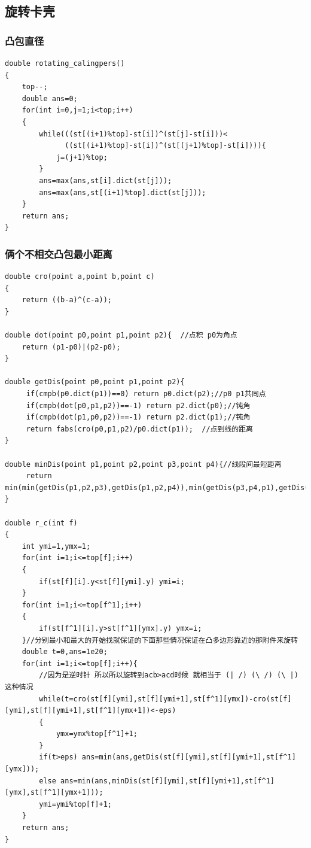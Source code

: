 \documentclass[12pt, a4paper, oneside]{ctexart}
\begin{document}
\newpage 
\subsection{旋转卡壳} 
\subsubsection{凸包直径}
\begin{lstlisting}
double rotating_calingpers()
{
    top--;
 	double ans=0;
    for(int i=0,j=1;i<top;i++)
    {
        while(((st[(i+1)%top]-st[i])^(st[j]-st[i]))<
              ((st[(i+1)%top]-st[i])^(st[(j+1)%top]-st[i]))){
            j=(j+1)%top;
        }
        ans=max(ans,st[i].dict(st[j]));
        ans=max(ans,st[(i+1)%top].dict(st[j]));
    }
    return ans;
}
\end{lstlisting}

\newpage 
\subsubsection{俩个不相交凸包最小距离} 
\begin{lstlisting}
double cro(point a,point b,point c)
{
    return ((b-a)^(c-a));
}

double dot(point p0,point p1,point p2){  //点积 p0为角点
    return (p1-p0)|(p2-p0);
}
  
double getDis(point p0,point p1,point p2){
     if(cmpb(p0.dict(p1))==0) return p0.dict(p2);//p0 p1共同点
     if(cmpb(dot(p0,p1,p2))==-1) return p2.dict(p0);//钝角
     if(cmpb(dot(p1,p0,p2))==-1) return p2.dict(p1);//钝角
     return fabs(cro(p0,p1,p2)/p0.dict(p1));  //点到线的距离
}
  
double minDis(point p1,point p2,point p3,point p4){//线段间最短距离
     return min(min(getDis(p1,p2,p3),getDis(p1,p2,p4)),min(getDis(p3,p4,p1),getDis(p3,p4,p2)));
}

double r_c(int f)
{
    int ymi=1,ymx=1;
    for(int i=1;i<=top[f];i++) 
    {
        if(st[f][i].y<st[f][ymi].y) ymi=i;
    }
    for(int i=1;i<=top[f^1];i++) 
    {
        if(st[f^1][i].y>st[f^1][ymx].y) ymx=i;
    }//分别最小和最大的开始找就保证的下面那些情况保证在凸多边形靠近的那附件来旋转
    double t=0,ans=1e20;
    for(int i=1;i<=top[f];i++){
        //因为是逆时针 所以所以旋转到acb>acd时候 就相当于 (| /) (\ /) (\ |) 这种情况 
        while(t=cro(st[f][ymi],st[f][ymi+1],st[f^1][ymx])-cro(st[f][ymi],st[f][ymi+1],st[f^1][ymx+1])<-eps)
        {
            ymx=ymx%top[f^1]+1;
        }
        if(t>eps) ans=min(ans,getDis(st[f][ymi],st[f][ymi+1],st[f^1][ymx]));
        else ans=min(ans,minDis(st[f][ymi],st[f][ymi+1],st[f^1][ymx],st[f^1][ymx+1]));
        ymi=ymi%top[f]+1;
    }
    return ans;
}
\end{lstlisting}
\end{document}
